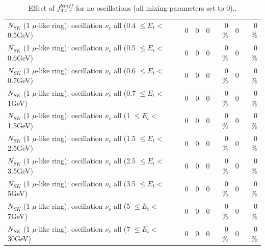 \begin{table}
\begin{tabular}{| l | r | r | r  r | r  r |}
$N_{SK}$ (1 $\mu$-like ring): oscillation $\nu_{e}$ all (0.4 $\leq E_{t} <$ 0.5GeV) &               0 &               0 &               0 &        0 \%  &               0 &        0 \%  \\ 
$N_{SK}$ (1 $\mu$-like ring): oscillation $\nu_{e}$ all (0.5 $\leq E_{t} <$ 0.6GeV) &               0 &               0 &               0 &        0 \%  &               0 &        0 \%  \\ 
$N_{SK}$ (1 $\mu$-like ring): oscillation $\nu_{e}$ all (0.6 $\leq E_{t} <$ 0.7GeV) &               0 &               0 &               0 &        0 \%  &               0 &        0 \%  \\ 
$N_{SK}$ (1 $\mu$-like ring): oscillation $\nu_{e}$ all (0.7 $\leq E_{t} <$ 1GeV) &               0 &               0 &               0 &        0 \%  &               0 &        0 \%  \\ 
$N_{SK}$ (1 $\mu$-like ring): oscillation $\nu_{e}$ all (1 $\leq E_{t} <$ 1.5GeV) &               0 &               0 &               0 &        0 \%  &               0 &        0 \%  \\ 
$N_{SK}$ (1 $\mu$-like ring): oscillation $\nu_{e}$ all (1.5 $\leq E_{t} <$ 2.5GeV) &               0 &               0 &               0 &        0 \%  &               0 &        0 \%  \\ 
$N_{SK}$ (1 $\mu$-like ring): oscillation $\nu_{e}$ all (2.5 $\leq E_{t} <$ 3.5GeV) &               0 &               0 &               0 &        0 \%  &               0 &        0 \%  \\ 
$N_{SK}$ (1 $\mu$-like ring): oscillation $\nu_{e}$ all (3.5 $\leq E_{t} <$ 5GeV) &               0 &               0 &               0 &        0 \%  &               0 &        0 \%  \\ 
 $N_{SK}$ (1 $\mu$-like ring): oscillation $\nu_{e}$ all (5 $\leq E_{t} <$ 7GeV) &               0 &               0 &               0 &        0 \%  &               0 &        0 \%  \\ 
$N_{SK}$ (1 $\mu$-like ring): oscillation $\nu_{e}$ all (7 $\leq E_{t} <$ 30GeV) &               0 &               0 &               0 &        0 \%  &               0 &        0 \%  \\ 
\hline
\hline
\end{tabular}
\caption{ Effect of $f_{9; t, r}^{banff}$ for no oscillations (all mixing parameters set to 0).. }
\label{tab:num_banff_09_1RmuT_3f_osc_t13:0}
\end{table}
\clearpage
